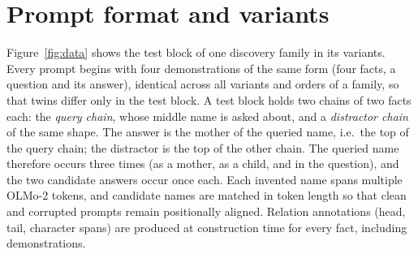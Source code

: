 \section{Prompt format and variants}
\label{app:data}

Figure~\ref{fig:data} shows the test block of one discovery family in its variants.
Every prompt begins with four demonstrations of the same form (four facts, a
question and its answer), identical across all variants and orders of a family, so
that twins differ only in the test block. A test block holds two chains of two facts
each: the \emph{query chain}, whose middle name is asked about, and a
\emph{distractor chain} of the same shape. The answer is the mother of the queried
name, i.e.\ the top of the query chain; the distractor is the top of the other chain.
The queried name therefore occurs three times (as a mother, as a child, and in the
question), and the two candidate answers occur once each. Each invented name spans multiple OLMo-2 tokens, and candidate names are matched in token length so that clean and corrupted prompts remain positionally aligned. Relation annotations (head, tail, character spans) are
produced at construction time for every fact, including demonstrations.

